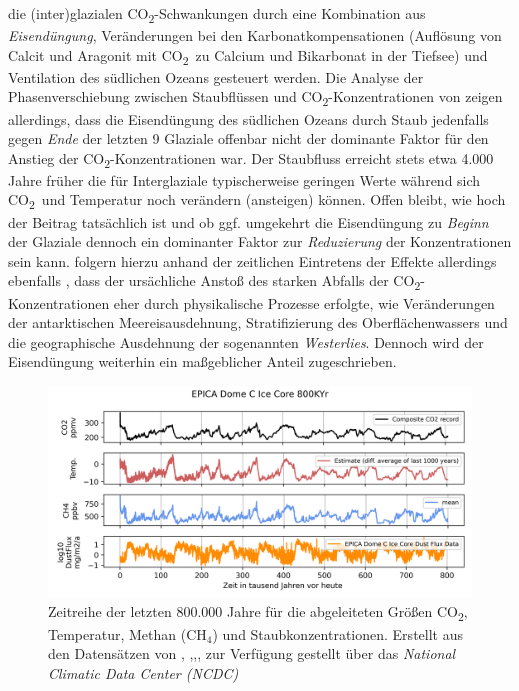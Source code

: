\documentclass[12pt,a4paper,onecolumn,draft]{scrartcl}
\newcommand{\cotwo}{CO\textsubscript{2}}
\begin{document}
die (inter)glazialen \cotwo -Schwankungen durch eine Kombination aus \textit{Eisendüngung}, Veränderungen bei den Karbonatkompensationen (Auflösung von Calcit und Aragonit mit  \cotwo \ zu Calcium und Bikarbonat in der Tiefsee) und Ventilation des südlichen Ozeans \citep{Lambert.2012} gesteuert werden. Die Analyse der Phasenverschiebung zwischen Staubflüssen und \cotwo -Konzentrationen von \citet{Lambert.2012} zeigen allerdings, dass die Eisendüngung des südlichen Ozeans durch Staub jedenfalls gegen \textit{Ende} der letzten 9 Glaziale offenbar nicht der dominante Faktor für den Anstieg der \cotwo -Konzentrationen war. Der Staubfluss erreicht stets etwa 4.000 Jahre früher die für Interglaziale typischerweise  geringen Werte während sich \cotwo \ und Temperatur noch verändern (ansteigen) können. Offen bleibt, wie hoch der Beitrag tatsächlich ist und ob ggf. umgekehrt die Eisendüngung zu \textit{Beginn} der Glaziale dennoch ein dominanter Faktor zur \textit{Reduzierung} der Konzentrationen sein kann. \citet{MartinezGarcia.2009} folgern hierzu anhand der zeitlichen Eintretens der Effekte allerdings ebenfalls , dass der ursächliche Anstoß des starken Abfalls der \cotwo -Konzentrationen eher durch physikalische Prozesse erfolgte, wie Veränderungen der antarktischen Meereisausdehnung, Stratifizierung des Oberflächenwassers und die geographische Ausdehnung der sogenannten \textit{Westerlies}. Dennoch wird der Eisendüngung weiterhin ein maßgeblicher Anteil zugeschrieben.

\begin{figure}[ht]
\centering
\includegraphics[width=\textwidth]{bilder/epica_icecore.png}
\caption{ Zeitreihe der letzten 800.000 Jahre für die abgeleiteten Größen \cotwo, Temperatur, Methan (CH$_4$) und Staubkonzentrationen. Erstellt aus den Datensätzen von \cite{Jouzel.2007}, \cite{Lambert.2012},\cite{Loulergue.2008},\cite{Bereiter.2015}, zur Verfügung gestellt über das \textit{National Climatic Data Center (NCDC) }  }   \label{fig:icecore}
\end{figure}
\end{document}
